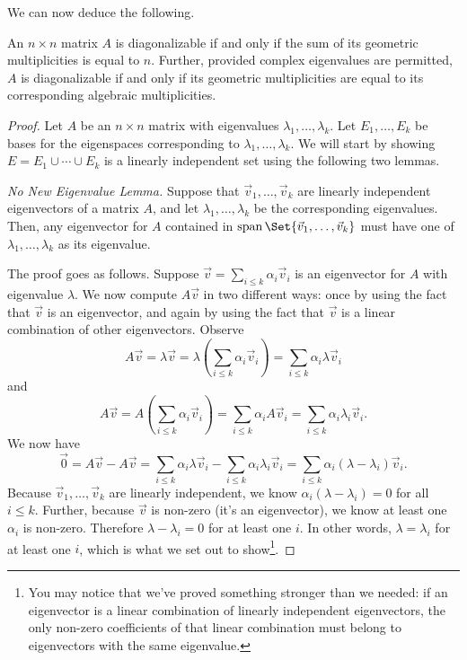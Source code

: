 We can now deduce the following.
\begin{theorem}
	An $n\times n$ matrix $A$ is diagonalizable if and only if the sum of its geometric multiplicities
	is equal to $n$. Further, provided complex eigenvalues are permitted, $A$ is diagonalizable if and
	only if its geometric multiplicities are equal to its corresponding algebraic multiplicities.
\end{theorem}
\begin{proof}
	Let $A$ be an $n\times n$ matrix with eigenvalues $\lambda_1,\ldots,\lambda_k$. Let $E_1,\ldots,E_k$
	be bases for the eigenspaces corresponding to $\lambda_1,\ldots,\lambda_k$. We will start by showing $E=E_1\cup\cdots\cup E_k$
	is a linearly independent set using the following two lemmas.

	\emph{\color{myorange}No New Eigenvalue Lemma.} Suppose that $\vec v_1,\ldots,\vec v_k$ are linearly independent eigenvectors
	of a matrix $A$, and let $\lambda_1,\ldots,\lambda_k$ be the  corresponding eigenvalues. Then, any eigenvector for $A$ contained in
	$\Span\Set{\vec v_1,\ldots,\vec v_k}$ must have one of $\lambda_1,\ldots,\lambda_k$ as its eigenvalue.

	The proof goes as follows. Suppose $\vec v=\sum_{i\leq k}\alpha_i\vec v_i$ is an eigenvector for $A$ with
	eigenvalue $\lambda$. We now compute $A\vec v$ in two different ways: once by using the fact that $\vec v$ is an eigenvector, and
	again by using the fact that $\vec v$ is a linear combination of other eigenvectors. Observe
	\[
		A\vec v=\lambda \vec v=\lambda\left(\sum_{i\leq k}\alpha_i\vec v_i\right)
		=\sum_{i\leq k}\alpha_i\lambda\vec v_i
	\]
	and
	\[
		A\vec v=A\left(\sum_{i\leq k}\alpha_i\vec v_i\right)
		=\sum_{i\leq k}\alpha_i A\vec v_i
		=\sum_{i\leq k}\alpha_i\lambda_i\vec v_i.
	\]
	We now have
	\[
		\vec 0=A\vec v-A\vec v = 
		\sum_{i\leq k}\alpha_i\lambda\vec v_i
		-\sum_{i\leq k}\alpha_i\lambda_i\vec v_i
		=\sum_{i\leq k}\alpha_i(\lambda-\lambda_i)\vec v_i.
	\]
	Because $\vec v_1,\ldots,\vec v_k$ are linearly independent, we know $\alpha_i(\lambda-\lambda_i)=0$ for all $i\leq k$.
	Further, because $\vec v$ is non-zero (it's an eigenvector),
	we know at least one $\alpha_i$ is non-zero. Therefore $\lambda-\lambda_i=0$ for at least one
	$i$. In other words, $\lambda=\lambda_i$ for at least one $i$, which is what we set out to show\footnote{ You may notice
	that we've proved something stronger than we needed: if an eigenvector is a linear combination of linearly independent eigenvectors,
	the only non-zero coefficients of that linear combination must belong to eigenvectors with the same eigenvalue.}.


\end{proof}
